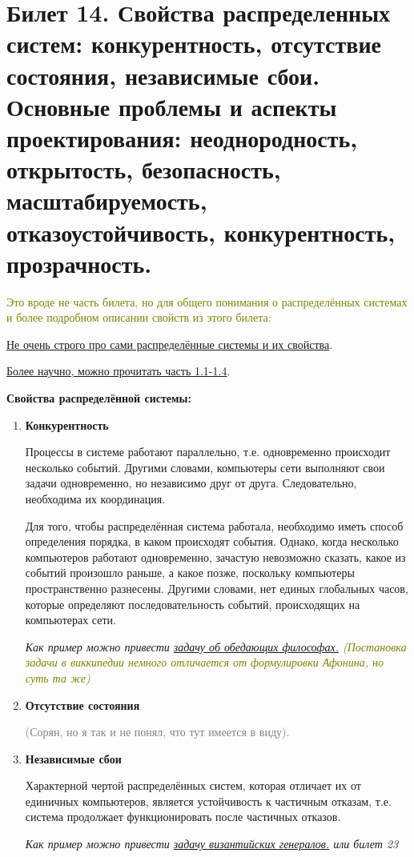 \newpage
\section{Билет 14. Свойства распределенных систем: конкурентность, отсутствие состояния, независимые сбои. Основные проблемы и аспекты проектирования: неоднородность, открытость, безопасность, масштабируемость, отказоустойчивость, конкурентность, прозрачность.}

\textcolor{olive}{Это вроде не часть билета, но для общего понимания о распределённых системах и более подробном описании свойств из этого билета:}

\textcolor{blue}{\href{https://novator.io/innovatsii/mir-raspredelyonnyh-sistem-ego-zakony-i-magiya-konsensusa-nakamoto}{Не очень строго про сами распределённые системы и их свойства}.}

\textcolor{blue}{\href{https://books.ifmo.ru/file/pdf/1551.pdf}{Более научно, можно прочитать часть 1.1-1.4}.}

\textbf{ Свойства распределённой системы:}
\begin{enumerate}
\item \textbf{Конкурентность}

Процессы в системе работают параллельно, т.е. одновременно происходит несколько событий. Другими словами, компьютеры сети выполняют свои задачи одновременно, но независимо друг от друга. Следовательно, необходима их координация.

Для того, чтобы распределённая система работала, необходимо иметь способ определения порядка, в каком происходят события. Однако, когда несколько компьютеров работают одновременно, зачастую невозможно сказать, какое из событий произошло раньше, а какое позже, поскольку компьютеры пространственно разнесены. Другими словами, нет единых глобальных часов, которые определяют последовательность событий, происходящих на компьютерах сети.

\textit{Как пример можно привести \textcolor{blue}{\href{https://ru.wikipedia.org/wiki/Задача_об_обедающих_философах}{ задачу об обедающих философах.}} \textcolor{olive}{(Постановка задачи в виккипедии немного отличается от формулировки Афонина, но суть та же)}}

\item \textbf{ Отсутствие состояния}

\textcolor{gray}{(Сорян, но я так и не понял, что тут имеется в виду).}

\item \textbf{ Независимые сбои}

Характерной чертой распределённых систем, которая отличает их от единичных компьютеров, является устойчивость к частичным отказам, т.е. система продолжает функционировать после частичных отказов.

\textit{Как пример можно привести \textcolor{blue}{\href{https://ru.wikipedia.org/wiki/Задача_византийских_генералов}{задачу византийских генералов.}} или билет 23}
\end{enumerate}

